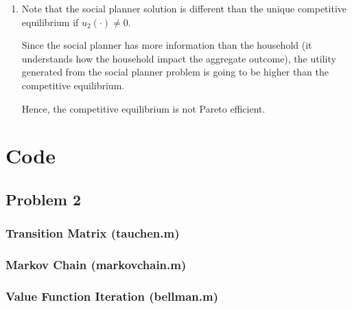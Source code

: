 \documentclass[12pt]{article}
\theoremstyle{definition}
\begin{document}
\begin{enumerate}[1.]
	\item
	
	Note that the social planner solution is different than the unique competitive equilibrium if $u_2(\cdot)\neq0$. 
	
	Since the social planner has more information than the household (it understands how the household impact the aggregate outcome), the utility generated from the social planner problem is going to be higher than the competitive equilibrium. 
	
	Hence, the competitive equilibrium is not Pareto efficient.
\end{enumerate}


\section*{Code}
\subsection*{Problem 2}

\subsubsection*{Transition Matrix (tauchen.m)}

\subsubsection*{Markov Chain (markovchain.m)}

\subsubsection*{Value Function Iteration (bellman.m)}

\end{document}

